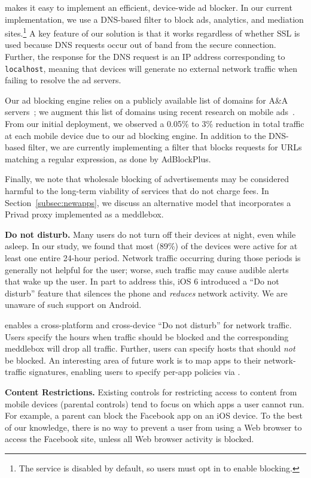\meddle makes it easy to implement an efficient, device-wide ad blocker. 
In our current implementation, we use a DNS-based filter to
block ads, analytics, and mediation sites.\footnote{The service is disabled by default, so users must 
opt in to enable blocking.} A key feature of our solution is that it works 
regardless of whether SSL is used because DNS requests occur out of band 
from the secure connection. Further, the response for the DNS request is an IP address corresponding to {\tt localhost}, 
meaning that devices will generate no external network traffic when failing 
to resolve the ad servers. 


Our ad blocking engine relies on a publicly available list of domains for A\&A servers~\cite{YoyoAds}; we augment this list of domains using 
recent research on mobile ads~\cite{hornyack:appfence,
  Leontiadis:2012:AdsMobile}. From our initial deployment, we observed a 0.05\% to 3\% reduction
in total traffic at each mobile device due to our ad blocking engine. 
In addition to the DNS-based filter, we are currently implementing a filter that blocks 
requests for URLs matching a regular expression, as done by AdBlockPlus.

Finally, we note that wholesale blocking of advertisements may be considered harmful 
to the long-term viability of services that do not charge fees. In Section~\ref{subsec:newapps}, 
we discuss an alternative model that incorporates a Privad proxy implemented as a meddlebox. 

\noindent\textbf{Do not disturb.} 
Many users do not turn off their devices at night, even while asleep. In our study, we found that 
most (89\%) of the devices were active for at least one entire 24-hour period. Network 
traffic occurring during those periods is generally not helpful for the user; worse, 
such traffic may cause audible alerts that wake up the user. In part to address this, 
iOS 6 introduced a ``Do not disturb'' feature that silences the phone and \emph{reduces} 
network activity. We are unaware of such support on Android.

\meddle enables a cross-platform and cross-device ``Do not disturb'' for network 
traffic. Users specify the hours when traffic should be blocked and the corresponding 
meddlebox will drop all traffic. Further, users can specify hosts that should \emph{not} be 
blocked. An interesting area of future work is to map apps to their network-traffic 
signatures, enabling users to specify per-app policies via \meddle.

\noindent\textbf{Content Restrictions.} 
Existing controls for restricting access to content from mobile devices (\eg parental controls) 
tend to focus on which apps a user cannot run. For example, a parent can block the Facebook app on an iOS device. 
To the best of our knowledge, there is no way to prevent a user from using a 
Web browser to access the Facebook site, unless all Web browser activity is blocked. 


